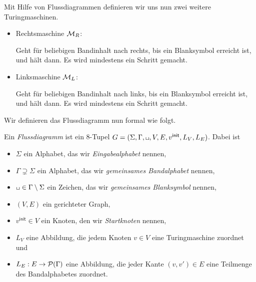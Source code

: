 \begin{Bsp}
 Mit Hilfe von Flussdiagrammen definieren wir uns nun zwei weitere Turingmaschinen.
  \begin{itemize}
  \item Rechtsmaschine $\mathcal{M}_R$:
  
  Geht für beliebigen Bandinhalt nach rechts, bis ein Blanksymbol erreicht ist, und hält dann.
  Es wird mindestens ein Schritt gemacht.
  

  
  \item Linksmaschine $\mathcal{M}_L$:
  
  Geht für beliebigen Bandinhalt nach links, bis ein Blanksymbol erreicht ist, und hält dann.
  Es wird mindestens ein Schritt gemacht.

  \qedhere
 \end{itemize}
\end{Bsp}

Wir definieren das Flussdiagramm nun formal wie folgt.


\begin{Def}[name={[Flussdiagram]}]
	Ein \emph{Flussdiagramm} ist ein 8-Tupel $G=(\Sigma, \Gamma, \blank,V,E,v^\mathsf{init},L_V,L_E)$.
	Dabei ist
	\begin{itemize}
		\item $\Sigma$ ein Alphabet, das wir \emph{Eingabealphabet} nennen,
		\item $\Gamma\supsetneq \Sigma$ ein Alphabet, das wir \emph{gemeinsames Bandalphabet} nennen,
		\item $\blank\in \Gamma\setminus\Sigma$ ein Zeichen, das wir \emph{gemeinsames Blanksymbol} nennen,
		\item $(V,E)$ ein gerichteter Graph,
		\item $v^\mathsf{init}\in V$ ein Knoten, den wir \emph{Startknoten} nennen,
		\item $L_V$ eine Abbildung, die jedem Knoten $v \in V$ eine Turingmaschine zuordnet und
		\item $L_E: E \to \mathcal{P}(\Gamma)$ eine Abbildung, die jeder Kante $(v,v')\in E$ eine Teilmenge des Bandalphabetes zuordnet.
		\qedhere
	\end{itemize}
\end{Def}


